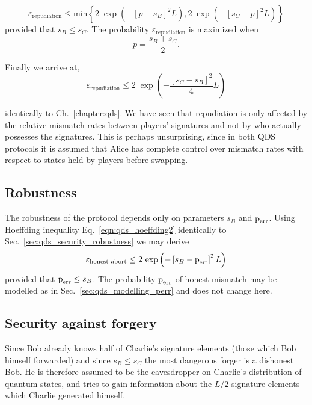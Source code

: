 \begin{equation}
\varepsilon_{\text{repudiation}} \le \text{min}\left\{ 2 \; \exp\left(-\left[ p - s_B\right]^2 L\right), 2 \; \exp\left( - \left[ s_C - p\right]^2 L\right) \right\}
\end{equation}
\noindent 
provided that $s_B \le s_C$. The probability $\varepsilon_{\text{repudiation}}$ is maximized when
\begin{equation}
p = \frac{s_B + s_C}{2}.
\end{equation}

\noindent Finally we arrive at,
\begin{equation}\label{eqn:aqc_repudiation}
\varepsilon_{\text{repudiation}} \le 2 \; \exp\left( - \frac{\left[s_C - s_B\right]^2}{4}L\right)
\end{equation}

\noindent identically to Ch.~\ref{chapter:qds}. We have seen that repudiation is only affected by the relative mismatch rates between players' signatures and not by who actually possesses the signatures. This is perhaps unsurprising, since in both QDS protocols it is assumed that Alice has complete control over mismatch rates with respect to states held by players before swapping.

\subsection{Robustness}
The robustness of the protocol depends only on parameters $s_B$ and $\text{p}_{\text{err}}$. Using Hoeffding inequality Eq.~\ref{eqn:qds_hoeffding2} identically to Sec.~\ref{sec:qds_security_robustness} we may derive 
\begin{equation}\label{eqn:aqc_robustness}
\varepsilon_{\text{honest abort}} \le 2 \, \exp\left( - \left[s_B - \text{p}_{\text{err}}\right]^2 L\right)
\end{equation}
provided that $\text{p}_{\text{err}} \le s_B$. The probability $\text{p}_{\text{err}}$ of honest mismatch may be modelled as in Sec.~\ref{sec:qds_modelling_perr} and does not change here.

\subsection{Security against forgery}
Since Bob already knows half of Charlie's signature elements (those which Bob himself forwarded) and since $s_B \le s_C$ the most dangerous forger is a dishonest Bob. He is therefore assumed to be the eavesdropper on Charlie's distribution of quantum states, and tries to gain information about the $L/2$ signature elements which Charlie generated himself.

